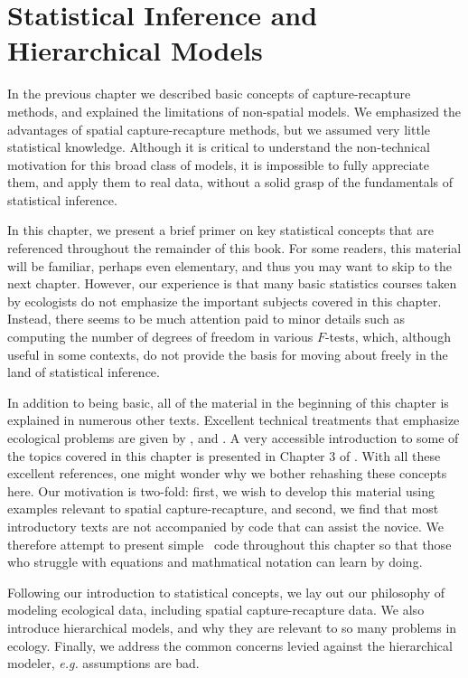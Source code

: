\chapter{
Statistical Inference and Hierarchical Models
}
\label{chapt.modeling}


\vspace{.3in}

In the previous chapter we described basic concepts of
capture-recapture methods, and explained the limitations of
non-spatial models. We emphasized the advantages of
spatial capture-recapture methods, but we assumed very little
statistical knowledge. Although it is critical to understand the
non-technical motivation for this broad class of models, it is
impossible to fully appreciate them, and apply them to real data,
without a solid grasp of the fundamentals of statistical
inference.

In this chapter, we present a brief primer on key
statistical concepts that are referenced throughout the remainder of
this book. For some readers, this material will be familiar,
perhaps even elementary, and thus you may want to skip to the next
chapter. However, our experience is that many basic statistics courses
taken by ecologists do not emphasize the important subjects covered in
this chapter. Instead, there seems to be much attention paid to
minor details such as computing the number of degrees of freedom in
various $F$-tests, which, although useful in some contexts, do not
provide the basis for moving about freely in the land of statistical
inference.

In addition to being basic, all of the material in the
beginning of this chapter is explained in numerous other
texts. Excellent technical treatments that emphasize ecological
problems are given by
\citet{williams_etal:2002}, \citet{royle_dorazio:2008} and
\citet{link_barker:2010}. A very accessible introduction to some of the
topics covered in this chapter is presented in Chapter 3 of
\citet{mackenzie_etal:2006}. With all these excellent references, one
might wonder why we bother rehashing these concepts here. Our motivation is
two-fold: first, we wish to develop this material using examples
relevant to spatial capture-recapture, and second, we find that most
introductory texts are not accompanied by code that can
assist the novice. We therefore attempt to present simple \R~code
throughout this chapter so that those who struggle with equations and
mathmatical notation can learn by doing.

Following our introduction to statistical concepts, we lay out our
philosophy of modeling ecological data, including spatial
capture-recapture data. We also introduce hierarchical
models, and why they are relevant to so many problems in
ecology. Finally, we address the common concerns levied against the
hierarchical modeler, \emph{e.g.} assumptions are bad.

